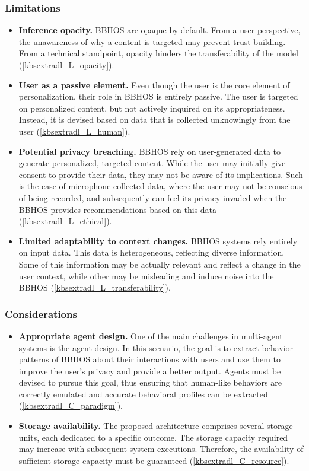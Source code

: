 \subsubsection*{Limitations}
\begin{itemize}
    \item \textbf{Inference opacity.} BBHOS are opaque by default. From a user perspective, the unawareness of why a content is targeted may prevent trust building. From a technical standpoint, opacity hinders the transferability of the model (\ref{kbsextradl_L_opacity}).
    
    \item \textbf{User as a passive element.} Even though the user is the core element of personalization, their role in BBHOS is entirely passive. The user is targeted on personalized content, but not actively inquired on its appropriateness. Instead, it is devised based on data that is collected unknowingly from the user (\ref{kbsextradl_L_human}).
    
    \item \textbf{Potential privacy breaching.} BBHOS rely on user-generated data to generate personalized, targeted content. While the user may initially give consent to provide their data, they may not be aware of its implications. Such is the case of microphone-collected data, where the user may not be conscious of being recorded, and subsequently can feel its privacy invaded when the BBHOS provides recommendations based on this data (\ref{kbsextradl_L_ethical}).
    
    \item \textbf{Limited adaptability to context changes.} BBHOS systems rely entirely on input data. This data is heterogeneous, reflecting diverse information. Some of this information may be actually relevant and reflect a change in the user context, while other may be misleading and induce noise into the BBHOS (\ref{kbsextradl_L_transferability}). 
\end{itemize}
\subsubsection*{Considerations}
\begin{itemize}
   \item \textbf{Appropriate agent design.} One of the main challenges in multi-agent systems is the agent design. In this scenario, the goal is to extract behavior patterns of BBHOS about their interactions with users and use them to improve the user's privacy and provide a better output. Agents must be devised to pursue this goal, thus ensuring that human-like behaviors are correctly emulated and accurate behavioral profiles can be extracted (\ref{kbsextradl_C_paradigm}).
    
    \item \textbf{Storage availability.} The proposed architecture comprises several storage units, each dedicated to a specific outcome. The storage capacity required may increase with subsequent system executions. Therefore, the availability of sufficient storage capacity must be guaranteed (\ref{kbsextradl_C_resource}).
\end{itemize}
